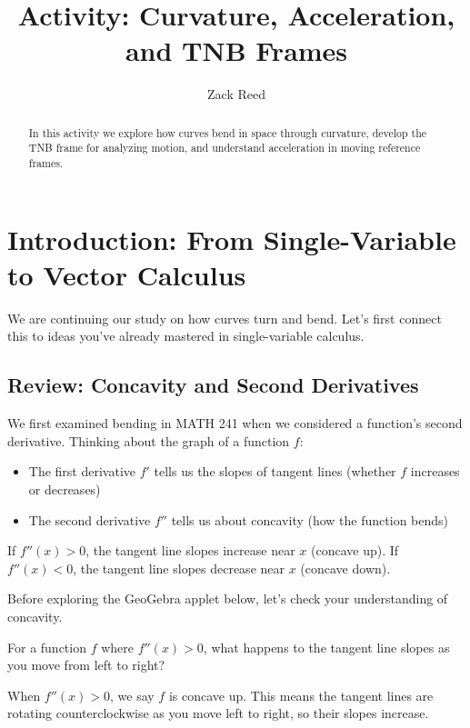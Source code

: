 \documentclass{ximera}
\title{Activity: Curvature, Acceleration, and TNB Frames}
\author{Zack Reed}
\begin{document}
\begin{abstract}
In this activity we explore how curves bend in space through curvature, develop the TNB frame for analyzing motion, and understand acceleration in moving reference frames.
\end{abstract}
\maketitle

\section*{Introduction: From Single-Variable to Vector Calculus}

We are continuing our study on how curves turn and bend. Let's first connect this to ideas you've already mastered in single-variable calculus.

\subsection*{Review: Concavity and Second Derivatives}

We first examined bending in MATH 241 when we considered a function's second derivative. Thinking about the graph of a function $f$:
\begin{itemize}
    \item The first derivative $f'$ tells us the slopes of tangent lines (whether $f$ increases or decreases)
    \item The second derivative $f''$ tells us about concavity (how the function bends)
\end{itemize}

If $f''(x)>0$, the tangent line slopes increase near $x$ (concave up). If $f''(x)<0$, the tangent line slopes decrease near $x$ (concave down).

\begin{problem}
Before exploring the GeoGebra applet below, let's check your understanding of concavity.

For a function $f$ where $f''(x)  > 0$, what happens to the tangent line slopes as you move from left to right?
\begin{multipleChoice}
\end{multipleChoice}

\begin{feedback}
When $f''(x)  > 0$, we say $f$ is concave up. This means the tangent lines are rotating counterclockwise as you move left to right, so their slopes increase.
\end{feedback}
\end{problem}
\end{document}
